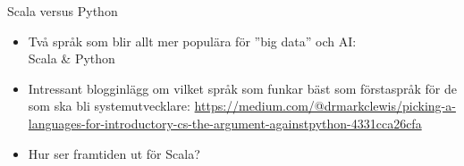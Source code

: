 %
%
%



\begin{Slide}{Scala versus Python}
  \begin{itemize}
    \item 
    Två språk som blir allt mer populära för ''big data'' och AI: \\ Scala \& Python
    \item Intressant blogginlägg om vilket språk som funkar bäst som förstaspråk för de som ska bli systemutvecklare:
    {\tiny\url{https://medium.com/@drmarkclewis/picking-a-languages-for-introductory-cs-the-argument-againstpython-4331cca26cfa}}
    \item Hur ser framtiden ut för Scala?
  \end{itemize}
\end{Slide}



